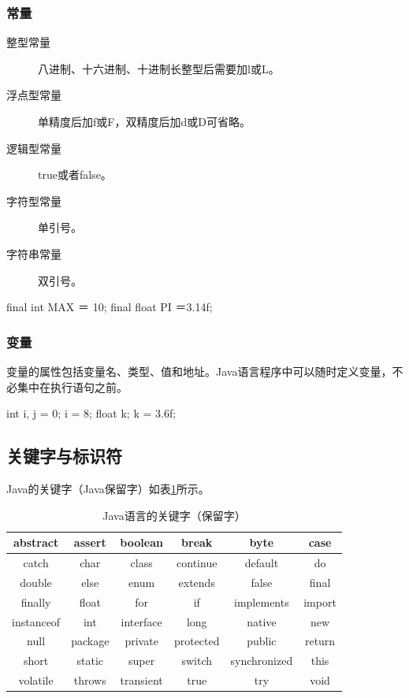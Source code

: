 \subsubsection{常量}

\begin{description}
\item[整型常量] 八进制、十六进制、十进制长整型后需要加l或L。
\item[浮点型常量] 单精度后加f或F，双精度后加d或D可省略。
\item[逻辑型常量] true或者false。
\item[字符型常量] 单引号。
\item[字符串常量] 双引号。
\end{description}


\begin{javaCode}
  final int MAX ＝ 10;
  final float PI ＝3.14f;
\end{javaCode}

\subsubsection{变量}

变量的属性包括变量名、类型、值和地址。Java语言程序中可以随时定义变量，不必集中在执行语句之前。


\begin{javaCode}
  int i, j = 0;
  i = 8;
  float k;
  k = 3.6f;
\end{javaCode}


\subsection{关键字与标识符}

Java的关键字（Java保留字）如表\ref{tab:java-key-word}所示。

\begin{table}[!htbp]
  \centering
  \caption{Java语言的关键字（保留字）}
  \label{tab:java-key-word}
  \begin{tabular}{|c|c|c|c|c|c|}
    \hline
    abstract & assert & boolean & break & byte & case \\
    \hline
    catch & char & class & continue & default & do \\
    \hline
    double & else & enum & extends & false & final \\
    \hline    
    finally & float & for & if & implements & import \\
    \hline
    instanceof & int & interface & long & native & new \\
    \hline
    null & package & private & protected & public & return \\
    \hline
    short & static & super & switch & synchronized & this \\
    \hline
    volatile & throws & transient & true & try & void \\
    \hline
  \end{tabular}
\end{table}

